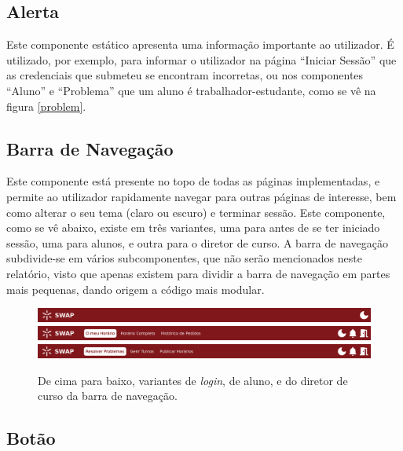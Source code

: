 \documentclass[12pt, a4paper]{article}
\begin{document}
\subsection{Alerta}

Este componente estático apresenta uma informação importante ao utilizador. É utilizado, por
exemplo, para informar o utilizador na página ``Iniciar Sessão'' que as credenciais que submeteu se
encontram incorretas, ou nos componentes ``Aluno'' e ``Problema'' que um aluno é
trabalhador-estudante, como se vê na figura \ref{problem}.

\subsection{Barra de Navegação}

Este componente está presente no topo de todas as páginas implementadas, e permite ao utilizador
rapidamente navegar para outras páginas de interesse, bem como alterar o seu tema (claro ou escuro)
e terminar sessão. Este componente, como se vê abaixo, existe em três variantes, uma para antes de
se ter iniciado sessão, uma para alunos, e outra para o diretor de curso. A barra de navegação
subdivide-se em vários subcomponentes, que não serão mencionados neste relatório, visto que apenas
existem para dividir a barra de navegação em partes mais pequenas, dando origem a código mais
modular.

\begin{figure}[H]
    \centering
    \includegraphics[width=\textwidth]{res/components/navbar-login.png}
    \includegraphics[width=\textwidth]{res/components/navbar-student.png}
    \includegraphics[width=\textwidth]{res/components/navbar-director.png}
    \caption{
        \onehalfspacing
        De cima para baixo, variantes de \emph{login}, de aluno, e do diretor de curso da barra de
        navegação.
    }
    \label{navbar}
\end{figure}

\subsection{Botão}
\end{document}
